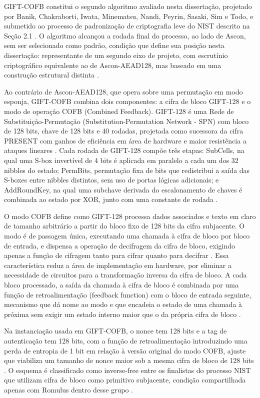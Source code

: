 GIFT-COFB constitui o segundo algoritmo avaliado nesta dissertação, projetado por Banik, Chakraborti, Iwata, Minematsu, Nandi, Peyrin, Sasaki, Sim e Todo, e submetido ao processo de padronização de criptografia leve do NIST descrito na Seção 2.1 \cite{Banik2021}. O algoritmo alcançou a rodada final do processo, ao lado de Ascon, sem ser selecionado como padrão, condição que define sua posição nesta dissertação: representante de um segundo eixo de projeto, com escrutínio criptográfico equivalente ao de Ascon-AEAD128, mas baseado em uma construção estrutural distinta \cite{nist_lwc_finalreport_2023}.

Ao contrário de Ascon-AEAD128, que opera sobre uma permutação em modo esponja, GIFT-COFB combina dois componentes: a cifra de bloco GIFT-128 e o modo de operação COFB (Combined Feedback). GIFT-128 é uma Rede de Substituição-Permutação (Substitution-Permutation Network - SPN) com bloco de 128 bits, chave de 128 bits e 40 rodadas, projetada como sucessora da cifra PRESENT com ganhos de eficiência em área de hardware e maior resistência a ataques lineares \cite{Banik2017}. Cada rodada de GIFT-128 compõe três etapas: SubCells, na qual uma S-box invertível de 4 bits é aplicada em paralelo a cada um dos 32 nibbles do estado; PermBits, permutação fixa de bits que redistribui a saída das S-boxes entre nibbles distintos, sem uso de portas lógicas adicionais; e AddRoundKey, na qual uma subchave derivada do escalonamento de chaves é combinada ao estado por XOR, junto com uma constante de rodada \cite{Banik2017}.

O modo COFB define como GIFT-128 processa dados associados e texto em claro de tamanho arbitrário a partir do bloco fixo de 128 bits da cifra subjacente. O modo é de passagem única, executando uma chamada à cifra de bloco por bloco de entrada, e dispensa a operação de decifragem da cifra de bloco, exigindo apenas a função de cifragem tanto para cifrar quanto para decifrar \cite{Banik2021}. Essa característica reduz a área de implementação em hardware, por eliminar a necessidade de circuitos para a transformação inversa da cifra de bloco. A cada bloco processado, a saída da chamada à cifra de bloco é combinada por uma função de retroalimentação (feedback function) com o bloco de entrada seguinte, mecanismo que dá nome ao modo e que encadeia o estado de uma chamada à próxima sem exigir um estado interno maior que o da própria cifra de bloco \cite{Banik2021}.

Na instanciação usada em GIFT-COFB, o nonce tem 128 bits e a tag de autenticação tem 128 bits, com a função de retroalimentação introduzindo uma perda de entropia de 1 bit em relação à versão original do modo COFB, ajuste que viabiliza um tamanho de nonce maior sob a mesma cifra de bloco de 128 bits \cite{Banik2021}. O esquema é classificado como inverse-free entre os finalistas do processo NIST que utilizam cifra de bloco como primitivo subjacente, condição compartilhada apenas com Romulus dentro desse grupo \cite{nist_lwc_finalreport_2023}.

